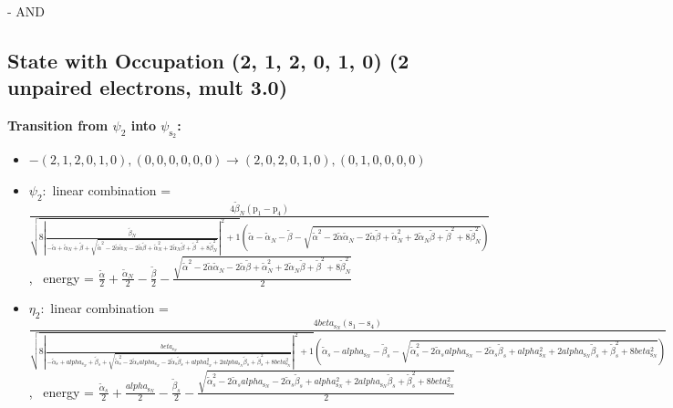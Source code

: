 \documentclass[12pt,a4paper]{article}
\begin{document}
 -  AND 
\subsection*{State with Occupation (2, 1, 2, 0, 1, 0) (2 unpaired electrons, mult 3.0)}
        \noindent\textbf{Transition from $\psi_{2}$ into $\psi_{\text{s}_{2}}$:}
        \begin{itemize}
            \item $- (2, 1, 2, 0, 1, 0), (0, 0, 0, 0, 0, 0) \rightarrow (2, 0, 2, 0, 1, 0), (0, 1, 0, 0, 0, 0)$
        
            \item $\psi_{2}:$ linear combination = $\frac{4 \tilde{\beta}_{N} \left(\text{p}_{1} - \text{p}_{4}\right)}{\sqrt{8 \left|{\frac{\tilde{\beta}_{N}}{- \tilde{\alpha} + \tilde{\alpha}_{N} + \tilde{\beta} + \sqrt{\tilde{\alpha}^{2} - 2 \tilde{\alpha} \tilde{\alpha}_{N} - 2 \tilde{\alpha} \tilde{\beta} + \tilde{\alpha}_{N}^{2} + 2 \tilde{\alpha}_{N} \tilde{\beta} + \tilde{\beta}^{2} + 8 \tilde{\beta}_{N}^{2}}}}\right|^{2} + 1} \left(\tilde{\alpha} - \tilde{\alpha}_{N} - \tilde{\beta} - \sqrt{\tilde{\alpha}^{2} - 2 \tilde{\alpha} \tilde{\alpha}_{N} - 2 \tilde{\alpha} \tilde{\beta} + \tilde{\alpha}_{N}^{2} + 2 \tilde{\alpha}_{N} \tilde{\beta} + \tilde{\beta}^{2} + 8 \tilde{\beta}_{N}^{2}}\right)}$, \
            energy = $\frac{\tilde{\alpha}}{2} + \frac{\tilde{\alpha}_{N}}{2} - \frac{\tilde{\beta}}{2} - \frac{\sqrt{\tilde{\alpha}^{2} - 2 \tilde{\alpha} \tilde{\alpha}_{N} - 2 \tilde{\alpha} \tilde{\beta} + \tilde{\alpha}_{N}^{2} + 2 \tilde{\alpha}_{N} \tilde{\beta} + \tilde{\beta}^{2} + 8 \tilde{\beta}_{N}^{2}}}{2}$
            
            \item $\eta_{2}:$ linear combination = $\frac{4 beta_{\text{s}_N} \left(\text{s}_{1} - \text{s}_{4}\right)}{\sqrt{8 \left|{\frac{beta_{\text{s}_N}}{- \tilde{\alpha}_{s} + alpha_{\text{s}_N} + \tilde{\beta}_{s} + \sqrt{\tilde{\alpha}_{s}^{2} - 2 \tilde{\alpha}_{s} alpha_{\text{s}_N} - 2 \tilde{\alpha}_{s} \tilde{\beta}_{s} + alpha_{\text{s}_N}^{2} + 2 alpha_{\text{s}_N} \tilde{\beta}_{s} + \tilde{\beta}_{s}^{2} + 8 beta_{\text{s}_N}^{2}}}}\right|^{2} + 1} \left(\tilde{\alpha}_{s} - alpha_{\text{s}_N} - \tilde{\beta}_{s} - \sqrt{\tilde{\alpha}_{s}^{2} - 2 \tilde{\alpha}_{s} alpha_{\text{s}_N} - 2 \tilde{\alpha}_{s} \tilde{\beta}_{s} + alpha_{\text{s}_N}^{2} + 2 alpha_{\text{s}_N} \tilde{\beta}_{s} + \tilde{\beta}_{s}^{2} + 8 beta_{\text{s}_N}^{2}}\right)}$, \
            energy = $\frac{\tilde{\alpha}_{s}}{2} + \frac{alpha_{\text{s}_N}}{2} - \frac{\tilde{\beta}_{s}}{2} - \frac{\sqrt{\tilde{\alpha}_{s}^{2} - 2 \tilde{\alpha}_{s} alpha_{\text{s}_N} - 2 \tilde{\alpha}_{s} \tilde{\beta}_{s} + alpha_{\text{s}_N}^{2} + 2 alpha_{\text{s}_N} \tilde{\beta}_{s} + \tilde{\beta}_{s}^{2} + 8 beta_{\text{s}_N}^{2}}}{2}$
            

\end{itemize}
\end{document}
